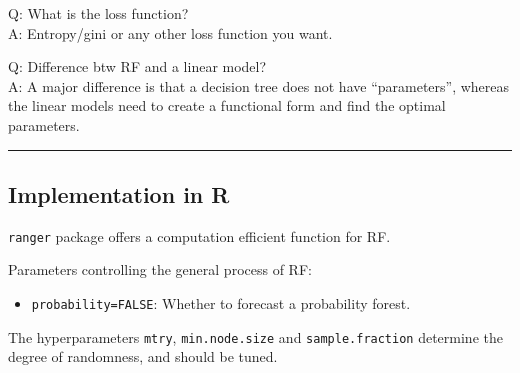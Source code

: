 \documentclass[
]{book}
\newenvironment{Shaded}{\begin{snugshade}}{\end{snugshade}}
\newcommand{\AttributeTok}[1]{\textcolor[rgb]{0.13,0.29,0.53}{#1}}
\newcommand{\CommentTok}[1]{\textcolor[rgb]{0.56,0.35,0.01}{\textit{#1}}}
\newcommand{\ConstantTok}[1]{\textcolor[rgb]{0.56,0.35,0.01}{#1}}
\newcommand{\FunctionTok}[1]{\textcolor[rgb]{0.13,0.29,0.53}{\textbf{#1}}}
\newcommand{\NormalTok}[1]{#1}
\newcommand{\OtherTok}[1]{\textcolor[rgb]{0.56,0.35,0.01}{#1}}
\newcommand{\SpecialCharTok}[1]{\textcolor[rgb]{0.81,0.36,0.00}{\textbf{#1}}}
\newcommand{\StringTok}[1]{\textcolor[rgb]{0.31,0.60,0.02}{#1}}
\providecommand{\tightlist}{%
  \setlength{\itemsep}{0pt}\setlength{\parskip}{0pt}}
\begin{document}
Q: What is the loss function?\\
A: Entropy/gini or any other loss function you want.

Q: Difference btw RF and a linear model?\\
A: A major difference is that a decision tree does not have ``parameters'', whereas the linear models need to create a functional form and find the optimal parameters.

\begin{center}\rule{0.5\linewidth}{0.5pt}\end{center}

\subsection*{Implementation in R}\label{implementation-in-r}

\texttt{ranger} package offers a computation efficient function for RF.

\begin{Shaded}
\end{Shaded}

Parameters controlling the general process of RF:

\begin{itemize}
\tightlist
\item
  \texttt{probability=FALSE}: Whether to forecast a probability forest.
\end{itemize}

The hyperparameters \texttt{mtry}, \texttt{min.node.size} and \texttt{sample.fraction} determine the degree of randomness, and should be tuned.
\end{document}
